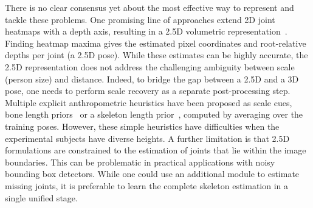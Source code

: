 There is no clear consensus yet about the most effective way to represent and tackle these problems.
One promising line of approaches extend 2D joint heatmaps with a depth axis, resulting in a 2.5D volumetric representation~\cite{Pavlakos17CVPR,Sun18ECCV,Iqbal18ECCV,Luvizon18CVPR}.
Finding heatmap maxima gives the estimated pixel coordinates and root-relative depths per joint (a 2.5D pose).
While these estimates can be highly accurate, the 2.5D representation does not address the challenging ambiguity between scale (person size) and distance.
Indeed, to bridge the gap between a 2.5D and a 3D pose, one needs to perform scale recovery as a separate post-processing step.
Multiple explicit anthropometric heuristics have been proposed as scale cues, \eg bone length priors~\cite{Pavlakos17CVPR} or a skeleton length prior~\cite{Sun18Arxiv}, computed by averaging over the training poses.
However, these simple heuristics have difficulties when the experimental subjects have diverse heights.
A further limitation is that 2.5D formulations are constrained to the estimation of joints that lie within the image boundaries.
This can be problematic in practical applications with noisy bounding box detectors.
While one could use an additional module to estimate missing joints, it is preferable to learn the complete skeleton estimation in a single unified stage.

